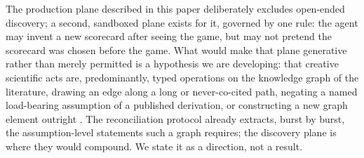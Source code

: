 The production plane described in this paper deliberately excludes
open-ended discovery; a second, sandboxed plane exists for it, governed by
one rule: the agent may invent a new scorecard after seeing the game, but
may not pretend the scorecard was chosen before the game. What would make
that plane generative rather than merely permitted is a hypothesis we are
developing: that creative scientific acts are, predominantly, typed
operations on the knowledge graph of the literature, drawing an edge along
a long or never-co-cited path, negating a named load-bearing assumption of
a published derivation, or constructing a new graph element outright
\citep{boden2004,swanson1986,2013Sci...342..468U,2013arXiv1302.6906F,wiggins2006}.
The reconciliation protocol already extracts, burst by burst, the
assumption-level statements such a graph requires; the discovery plane is
where they would compound. We state it as a direction, not a result.
